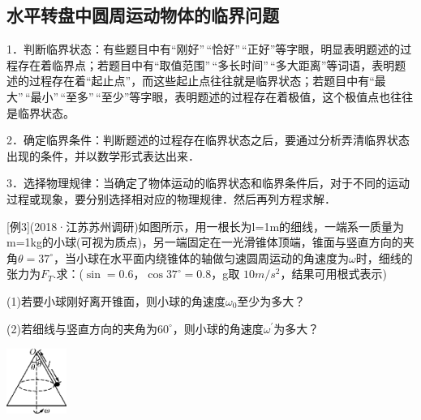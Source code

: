 \newpage
\subsection{水平转盘中圆周运动物体的临界问题}

1．判断临界状态：有些题目中有``刚好''\,``恰好''\,``正好''等字眼，明显表明题述的过程存在着临界点；若题目中有``取值范围''\,``多长时间''\,``多大距离''等词语，表明题述的过程存在着``起止点''，而这些起止点往往就是临界状态；若题目中有``最大''\,``最小''\,``至多''\,``至少''等字眼，表明题述的过程存在着极值，这个极值点也往往是临界状态。

2．确定临界条件：判断题述的过程存在临界状态之后，要通过分析弄清临界状态出现的条件，并以数学形式表达出来．

3．选择物理规律：当确定了物体运动的临界状态和临界条件后，对于不同的运动过程或现象，要分别选择相对应的物理规律．然后再列方程求解．

{[}例3{]}(2018·江苏苏州调研)如图所示，用一根长为l=1m的细线，一端系一质量为m=1kg的小球(可视为质点)，另一端固定在一光滑锥体顶端，锥面与竖直方向的夹角$\theta=37^\circ$，当小球在水平面内绕锥体的轴做匀速圆周运动的角速度为$\omega$时，细线的张力为$F_T$.求：($\sin=0.6$，$\cos37^\circ=0.8$，g取 $10m/s^2$，结果可用根式表示)

(1)若要小球刚好离开锥面，则小球的角速度$\omega_0$至少为多大？

(2)若细线与竖直方向的夹角为$60^\circ$，则小球的角速度$\omega^{'}$为多大？

\begin{center}\includegraphics[width=0.76667in,height=0.85in]{media/image185.png}\end{center}


